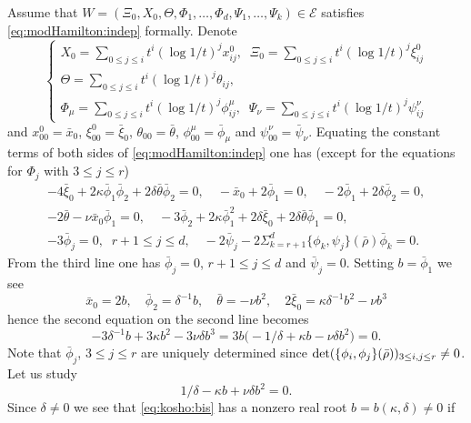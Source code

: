 \documentclass[12pt,leqno]{article} %
\def\de{\delta}
\def\bro{\bar\rho}
\def\bro{\bar\rho}
\numberwithin{equation}{section}
\begin{document}
%
%
Assume that $W=(\Xi_0,X_0, \Theta, \Phi_1,\ldots,\Phi_d,\Psi_1,\ldots,\Psi_k)\in {\mathcal E}$ satisfies \eqref{eq:modHamilton:indep} formally. Denote
%
\begin{equation}
\label{eq:okuto}
\left\{\begin{array}{lllll}
X_0=\sum_{0\leq j\leq
i}t^i(\log{1/t})^jx^{0}_{ij},\;\;
\Xi_0=\sum_{0\leq
j\leq i}t^i(\log{1/t})^j\xi^{0}_{ij}\\
\Theta=\sum_{0\leq j\leq
i}t^i(\log{1/t})^j\theta_{ij},\\
\Phi_{\mu}=\sum_{0\leq j\leq
i}t^i(\log{1/t})^j\phi^{\mu}_{ij},\;\;\Psi_{\nu}=\sum_{0\leq j\leq
i}t^i(\log{1/t})^j\psi^{\nu}_{ij}
\end{array}\right.
\end{equation}
%
and $x^0_{00}=\bar x_0$, $\xi^0_{00}=\bar\xi_0$, $\theta_{00}=\bar\theta$, $\phi^{\mu}_{00}=\bar\phi_{\mu}$ and $\psi^{\nu}_{00}=\bar\psi_{\nu}$. Equating the constant terms of both sides of
\eqref{eq:modHamilton:indep} one has (except for the equations for $\Phi_j$ with $3\leq j\leq r$)
%
%
\begin{eqnarray*}
-4\bar\xi_{0}+2\kappa\bar\phi_{1}\bar\phi_{2}+2\delta \bar\theta\bar\phi_{2}=0,\quad-\bar x_{0}+2\bar\phi_{1}=0,
\quad
-2\bar\phi_{1}+2\delta \bar\phi_{2}=0,\\
-2\bar\theta-\nu \bar x_0\bar \phi_1=0,\quad -3\bar\phi_{2}+2\kappa
\bar\phi_{1}^2+2\delta\bar\xi_0+2\delta \bar\theta \bar\phi_{1}=0,\\
-3\bar\phi_j=0,\;\;r+1\leq j\leq d,\quad -2\bar\psi_j-2\Sigma_{k=r+1}^d\{\phi_k,\psi_j\}(\bro)\bar\phi_k=0.
\end{eqnarray*}
%
From the third line one has $\bar\phi_j=0$, $r+1\leq j\leq d$ and $\bar\psi_j=0$. 
Setting $b=\bar\phi_{1}$ we see 
%
\[
\bar x_{0}=2b,\quad\bar\phi_{2}=\delta^{-1}b,\quad \bar\theta=-\nu b^2,\quad 
2\bar\xi_{0}=\kappa \delta^{-1}b^2-\nu b^3
\]
%
 hence the second equation on the second line becomes
%
\begin{equation}
\label{eq:b:kimeru}
-3\delta^{-1}b+3\kappa b^2- 3\nu\delta  b^3=3b\big(-1/\delta+\kappa b -  \nu\delta  b^2\big)=0.
\end{equation}
%
Note that $\bar\phi_j$, $3\leq j\leq r$ are uniquely determined since ${\rm det}(\{\phi_i,\phi_j\}(\bro))_{3\leq i,j\leq r}\neq 0$. Let us study 
%
\begin{equation}
\label{eq:kosho:bis}
1/\delta-\kappa b + \nu \delta b^2=0.
\end{equation}
%
Since $\delta\neq 0$ we see that \eqref{eq:kosho:bis} has a nonzero real root $b=b(\kappa,\de)\neq 0$ if 
\end{document}

